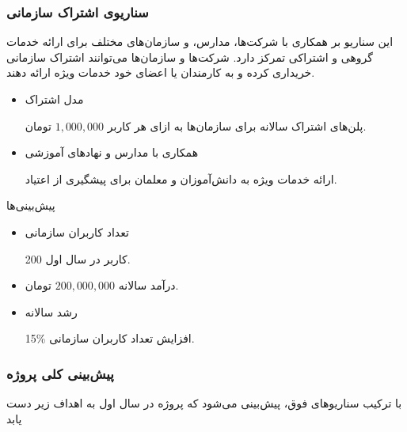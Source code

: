 \documentclass[dvipsnames, svgnames, x11names, 11pt]{article}
\begin{document}
\subsubsection{سناریوی اشتراک سازمانی }
این سناریو بر همکاری با شرکت‌ها، مدارس، و سازمان‌های مختلف برای ارائه خدمات گروهی و اشتراکی تمرکز دارد. شرکت‌ها و سازمان‌ها می‌توانند اشتراک سازمانی خریداری کرده و به کارمندان یا اعضای خود خدمات ویژه ارائه دهند.

\begin{itemize}
\item
مدل اشتراک

پلن‌های اشتراک سالانه برای سازمان‌ها به ازای هر کاربر
$1,000,000$
تومان.

\item
همکاری با مدارس و نهادهای آموزشی

ارائه خدمات ویژه به دانش‌آموزان و معلمان برای پیشگیری از اعتیاد.
\end{itemize}

پیش‌بینی‌ها

\begin{itemize}
\item
تعداد کاربران سازمانی

200 کاربر در سال اول.

\item
درآمد سالانه
$200,000,000$
تومان.

\item
رشد سالانه

15\% افزایش تعداد کاربران سازمانی.
\end{itemize}

\subsubsection{پیش‌بینی کلی پروژه }
با ترکیب سناریوهای فوق، پیش‌بینی می‌شود که پروژه در سال اول به اهداف زیر دست یابد
\end{document}
